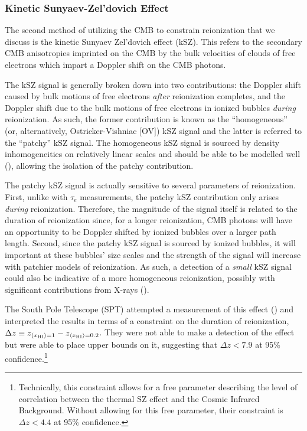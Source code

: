 \clearpage
\subsubsection{Kinetic Sunyaev-Zel'dovich Effect}

The second method of utilizing the CMB to constrain reionization that we discuss is the kinetic Sunyaev Zel'dovich effect (kSZ). This refers to the secondary CMB anisotropies imprinted on the CMB by the bulk velocities of clouds of free electrons which impart a Doppler shift on the CMB photons. 


The kSZ signal is generally broken down into two contributions: the Doppler shift caused by bulk motions of free electrons \textit{after} reionization completes, and the Doppler shift due to the bulk motions of free electrons in ionized bubbles \textit{during} reionization. As such, the former contribution is known as the ``homogeneous'' (or, alternatively, Ostricker-Vishniac [OV]) kSZ signal and the latter is referred to the ``patchy'' kSZ signal. The homogeneous kSZ signal is sourced by density inhomogeneities on relatively linear scales and should be able to be modelled well (\citealt{mesinger2012kinetic}), allowing the isolation of the patchy contribution.


The patchy kSZ signal is actually sensitive to several parameters of reionization. First, unlike with $\tau_{e}$ measurements, the patchy kSZ contribution only arises \textit{during} reionization. Therefore, the magnitude of the signal itself is related to the duration of reionization since, for a longer reionization, CMB photons will have an opportunity to be Doppler shifted by ionized bubbles over a larger path length. Second, since the patchy kSZ signal is sourced by ionized bubbles, it will important at these bubbles' size scales and the strength of the signal will increase with patchier models of reionization. As such, a detection of a \textit{small} kSZ signal could also be indicative of a more homogeneous reionization, possibly with significant contributions from X-rays (\citealt{visbal2012gauging}).

The South Pole Telescope (SPT) attempted a measurement of this effect (\citealt{Zahn2012}) and interpreted the results in terms of a constraint on the duration of reionization, $\Delta z \equiv z_{\langle x_{\text{HI}}\rangle=1} - z_{\langle x_{\text{HI}}\rangle = 0.2}$. They were not able to make a detection of the effect but were able to place upper bounds on it, suggesting that $\Delta z < 7.9$ at 95\% confidence.\footnote{Technically, this constraint allows for a free parameter describing the level of correlation between the thermal SZ effect and the Cosmic Infrared Background. Without allowing for this free parameter, their constraint is $\Delta z < 4.4$ at 95\% confidence.}


